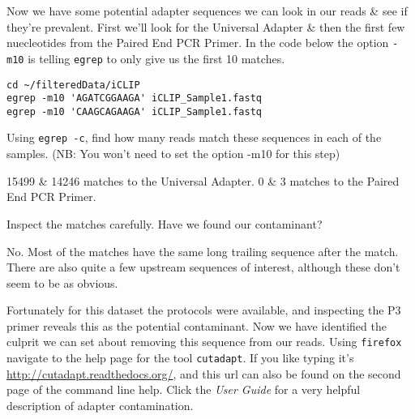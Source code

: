 \begin{steps}
Now we have some potential adapter sequences we can look in our reads \& see if they're prevalent.
First we'll look for the Universal Adapter \& then the first few nuecleotides from the Paired End PCR Primer.
In the code below the option \texttt{-m10} is telling \texttt{egrep} to only give us the first 10 matches.
\begin{lstlisting}
cd ~/filteredData/iCLIP
egrep -m10 'AGATCGGAAGA' iCLIP_Sample1.fastq
egrep -m10 'CAAGCAGAAGA' iCLIP_Sample1.fastq
\end{lstlisting}
\end{steps}

\begin{questions}
Using \texttt{egrep -c}, find how many reads match these sequences in each of the samples.
(NB: You won't need to set the option -m10 for this step)\\
\begin{answer}
15499 \& 14246 matches to the Universal Adapter.
0 \& 3 matches to the Paired End PCR Primer.\\
\end{answer}

Inspect the matches carefully.
Have we found our contaminant? \\
\begin{answer}
No. 
Most of the matches have the same long trailing sequence after the match.
There are also quite a few upstream sequences of interest, although these don't seem to be as obvious.
\end{answer}
\end{questions}

Fortunately for this dataset the protocols were available, and inspecting the P3 primer reveals this as the potential contaminant.
Now we have identified the culprit we can set about removing this sequence from our reads.
Using \texttt{firefox} navigate to the help page for the tool \texttt{cutadapt}.
If you like typing it's \url{http://cutadapt.readthedocs.org/}, and this url can also be found on the second page of the command line help.
Click the \textit{User Guide} for a very helpful description of adapter contamination.


